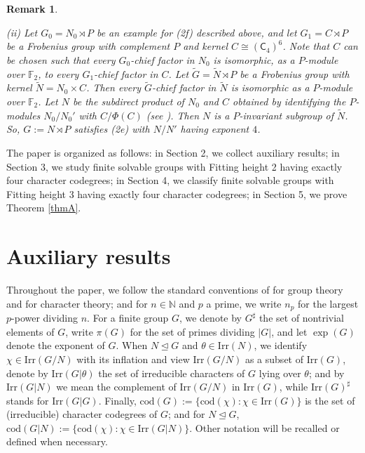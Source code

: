 \documentclass[9pt]{article}
\newtheorem*{rmkA}{\bf Remark}
\begin{document}
\begin{rmkA}
{\begin{description}
	(ii) Let $G_0=N_0  \rtimes P$ be an example for (2f) described above,
	and let $G_1=C \rtimes P$ be a Frobenius group with complement $P$ and kernel $C\cong (\mathsf{C}_{4})^6$.
	Note that $C$ can be chosen such that every $G_0$-chief factor in $N_0$ is isomorphic, as a $P$-module over $\mathbb{F}_2$, 
	to every $G_1$-chief factor in $C$.
	Let $\widetilde{G}=\widetilde{N} \rtimes P$ be a Frobenius group with kernel $\widetilde{N}=N_0\times C$.
	Then every $\widetilde{G}$-chief factor in $\widetilde{N}$ is isomorphic as a $P$-module over $\mathbb{F}_2$.
    Let $N$ be the subdirect product of $N_0$ and $C$ obtained by identifying the $P$-modules
	$N_0/N_0'$ with $C/\Phi(C)$ (see \cite[Kapitel I, 9.11 Satz]{huppertgrouptheory}).
	Then $N$ is a $P$-invariant subgroup of $\widetilde{N}$.
	So, $G:=N \rtimes P$ satisfies (2e) with $N/N'$ having exponent $4$. 
\end{description}
	}
\end{rmkA}





The paper is organized as follows: in Section 2, we collect auxiliary results; in Section 3, we study finite solvable groups with Fitting height 2 having exactly four character codegrees; in Section 4, we
classify finite solvable groups with Fitting height 3 having exactly four character codegrees;
in Section 5, we prove Theorem \ref{thmA}.




\section{Auxiliary results}


Throughout the paper, we follow the standard conventions of \cite{huppertgrouptheory} for group theory and \cite{isaacs1994} for character theory; 
and for $n\in\mathbb N$ and $p$ a prime, we write $n_{p}$ for the largest $p$-power dividing $n$.  
For a finite group $G$, we denote by $G^{\sharp}$ the set of nontrivial elements of $G$, write $\pi(G)$ for the set of primes dividing $|G|$, and let $\exp(G)$ denote the exponent of $G$.  When $N\unlhd G$ and $\theta\in\mathrm{Irr}(N)$, we identify $\chi\in \mathrm{Irr}(G/N)$ with its inflation and view $\mathrm{Irr}(G/N)$ as a subset
of $\mathrm{Irr}(G)$,
denote by $\mathrm{Irr}(G|\theta)$ the set of irreducible characters of $G$ lying over $\theta$; and by $\mathrm{Irr}(G|N)$ we mean the complement of $\mathrm{Irr}(G/N)$ in $\mathrm{Irr}(G)$,
while $\mathrm{Irr}(G)^{\sharp}$ stands for $\mathrm{Irr}(G|G)$.  
Finally,  $\mathrm{cod}(G):=\{ \mathrm{cod}(\chi) : \chi\in \mathrm{Irr}(G) \}$ is the set
of (irreducible) character codegrees of $G$; and for $N\unlhd G$,
$\mathrm{cod}(G|N):=\{ \mathrm{cod}(\chi):\chi\in \mathrm{Irr}(G|N) \}$.
Other notation will be recalled or defined when necessary.
\end{document}

